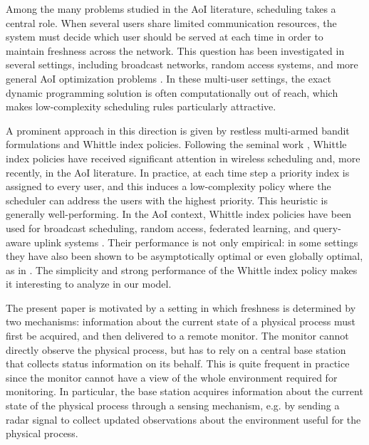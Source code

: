 \documentclass[letterpaper,journal]{IEEEtran}
\begin{document}
Among the many problems studied in the AoI literature, scheduling takes a central role. When several users share limited communication resources, the system must decide which user should be served at each time in order to maintain freshness across the network. This question has been investigated in several settings, including broadcast networks, random access systems, and more general AoI optimization problems \cite{kadota2018broadcast_aoi,sun2020closed_form_whittle,tripathi2024whittle_functions,zhou2024active_time_aoi,xu2024aoi_federated_learning,liu2025qaoi_whittle}. In these multi-user settings, the exact dynamic programming solution is often computationally out of reach, which makes low-complexity scheduling rules particularly attractive.

A prominent approach in this direction is given by restless multi-armed bandit formulations and Whittle index policies. Following the seminal work \cite{weber1990restless_bandits}, Whittle index policies have received significant attention in wireless scheduling and, more recently, in the AoI literature. In practice, at each time step a priority index is assigned to every user, and this induces a low-complexity policy where the scheduler can address the users with the highest priority. This heuristic is generally well-performing. In the AoI context, Whittle index policies have been used for broadcast scheduling, random access, federated learning, and query-aware uplink systems \cite{kadota2018broadcast_aoi,sun2020closed_form_whittle,tripathi2024whittle_functions,zhou2024active_time_aoi,xu2024aoi_federated_learning,liu2025qaoi_whittle}. Their performance is not only empirical: in some settings they have also been shown to be asymptotically optimal or even globally optimal, as in \cite{kriouile2022whittle,larranaga2017asymptotically}. The simplicity and strong performance of the Whittle index policy makes it interesting to analyze in our model.

The present paper is motivated by a setting in which freshness is determined by two mechanisms: information about the current state of a physical process must first be acquired, and then delivered to a remote monitor. The monitor cannot directly observe the physical process, but has to rely on a central base station that collects status information on its behalf. This is quite frequent in practice since the monitor cannot have a view of the whole environment required for monitoring. In particular, the base station acquires information about the current state of the physical process through a sensing mechanism, e.g.  by sending a radar signal to collect updated observations about  the environment useful for the physical process.
\end{document}
